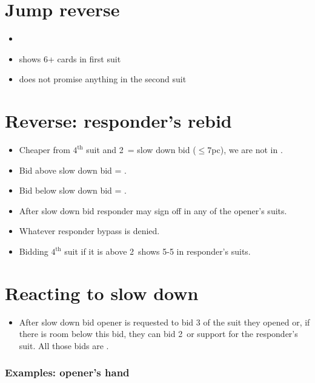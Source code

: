 \documentclass[12pt, a4paper]{article}
\begin{document}
\section{Jump reverse}
\begin{itemize}
    \item \gf
    \item shows 6+ cards in first suit
    \item does not promise anything in the second suit
\end{itemize}


\section{Reverse: responder's rebid}
\begin{itemize}
    \item Cheaper from $4^{\text{th}}$ suit and 2\nt\ = slow down bid ($\leq 7$pc), we are not in \gf.
    \item Bid above slow down bid = \gf.
    \item Bid below slow down bid = \fonce.
    \item After slow down bid responder may sign off in any of the opener's suits.
    \item Whatever responder bypass is denied. \vimp
    \item Bidding $4^{\text{th}}$ suit if it is above 2\nt\ shows 5-5 in responder's suits.
\end{itemize}

\section{Reacting to slow down}
\begin{itemize}
    \item After slow down bid opener is requested to bid 3 of the suit they opened or, if there is room
    below this bid, they can bid 2\nt\ or support for the responder's suit. All those bids are \nf.
\end{itemize}

\subsubsection*{Examples: opener's hand}
\end{document}
